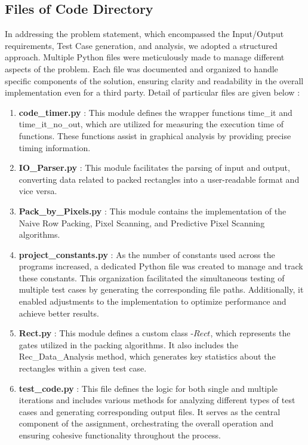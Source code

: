 \documentclass[12pt, a4paper,openany]{article}
\begin{document}
\subsection{Files of Code Directory}
\begin{flushleft}
    In addressing the problem statement, which encompassed the Input/Output requirements, Test Case generation, and analysis, we adopted a structured approach. Multiple Python files were meticulously made to manage different aspects of the problem. Each file was documented and organized to handle specific components of the solution, ensuring clarity and readability in the overall implementation even for a third party. Detail of particular files are given below :
\end{flushleft}
\begin{enumerate}
    \item \textbf{code\_timer.py} : This module defines the wrapper functions time\_it and time\_it\_no\_out, which are utilized for measuring the execution time of functions. These functions assist in graphical analysis by providing precise timing information.
    \item \textbf{IO\_Parser.py} : This module facilitates the parsing of input and output, converting data related to packed rectangles into a user-readable format and vice versa.
    \item \textbf{Pack\_by\_Pixels.py} : This module contains the implementation of the Naive Row Packing, Pixel Scanning, and Predictive Pixel Scanning algorithms.
    \item \textbf{project\_constants.py} : As the number of constants used across the programs increased, a dedicated Python file was created to manage and track these constants. This organization facilitated the simultaneous testing of multiple test cases by generating the corresponding file paths. Additionally, it enabled adjustments to the implementation to optimize performance and achieve better results.
    \item \textbf{Rect.py} : This module defines a custom class -\(Rect\), which represents the gates utilized in the packing algorithms. It also includes the Rec\_Data\_Analysis method, which generates key statistics about the rectangles within a given test case.
    \item \textbf{test\_code.py} : This file defines the logic for both single and multiple iterations and includes various methods for analyzing different types of test cases and generating corresponding output files. It serves as the central component of the assignment, orchestrating the overall operation and ensuring cohesive functionality throughout the process.

\end{enumerate}
\end{document}
